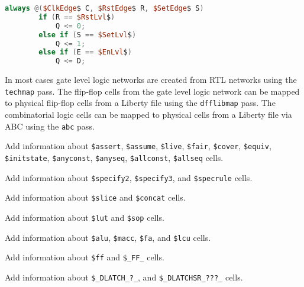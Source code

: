 \begin{lstlisting}[mathescape,language=Verilog]
	always @($ClkEdge$ C, $RstEdge$ R, $SetEdge$ S)
		if (R == $RstLvl$)
			Q <= 0;
		else if (S == $SetLvl$)
			Q <= 1;
		else if (E == $EnLvl$)
			Q <= D;
\end{lstlisting}

In most cases gate level logic networks are created from RTL networks using the {\tt techmap} pass. The flip-flop cells
from the gate level logic network can be mapped to physical flip-flop cells from a Liberty file using the {\tt dfflibmap}
pass. The combinatorial logic cells can be mapped to physical cells from a Liberty file via ABC 
using the {\tt abc} pass.

\begin{fixme}
Add information about {\tt \$assert}, {\tt \$assume}, {\tt \$live}, {\tt \$fair}, {\tt \$cover}, {\tt \$equiv},
{\tt \$initstate}, {\tt \$anyconst}, {\tt \$anyseq}, {\tt \$allconst}, {\tt \$allseq} cells.
\end{fixme}

\begin{fixme}
Add information about {\tt \$specify2}, {\tt \$specify3}, and {\tt \$specrule} cells.
\end{fixme}

\begin{fixme}
Add information about {\tt \$slice} and {\tt \$concat} cells.
\end{fixme}

\begin{fixme}
Add information about {\tt \$lut} and {\tt \$sop} cells.
\end{fixme}

\begin{fixme}
Add information about {\tt \$alu}, {\tt \$macc}, {\tt \$fa}, and {\tt \$lcu} cells.
\end{fixme}

\begin{fixme}
Add information about {\tt \$ff} and {\tt \$\_FF\_} cells.
\end{fixme}

\begin{fixme}
Add information about {\tt \$\_DLATCH\_?\_}, and {\tt \$\_DLATCHSR\_???\_} cells.
\end{fixme}
